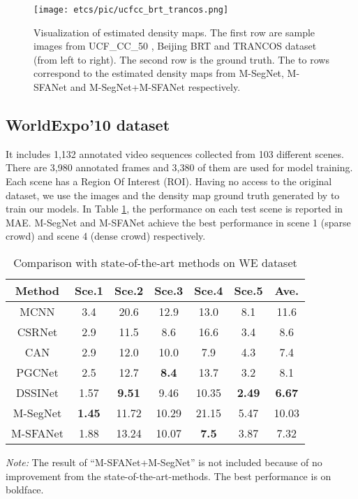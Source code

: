 \documentclass[10pt, conference, a4paper]{IEEEtran}
\begin{document}
\begin{figure}
    \centering
    \texttt{[image: etcs/pic/ucfcc\_brt\_trancos.png]}
    \caption{Visualization of estimated density maps. The first row are sample images from UCF\_CC\_50 \cite{bansal2015people}, Beijing BRT \cite{ding2018deeply} and TRANCOS \cite{guerrero2015extremely} dataset (from left to right). The second row is the ground truth. The  to  rows correspond to the estimated density maps from M-SegNet, M-SFANet and M-SegNet+M-SFANet respectively.}
    \label{fig:ucfcc_brt_trancos}
\end{figure}

\subsection{WorldExpo'10 dataset}
It includes 1,132 annotated video sequences collected from 103 different scenes. There are 3,980 annotated frames and 3,380 of them are used for model training. Each scene has a Region Of Interest (ROI). Having no access to the original dataset, we use the images and the density map ground truth generated by \cite{gao2019c} to train our models. In Table \ref{table:weres}, the performance on each test scene is reported in MAE. M-SegNet and M-SFANet achieve the best performance in scene 1 (sparse crowd) and scene 4 (dense crowd) respectively. 




\setlength{\tabcolsep}{4pt}
\begin{table}
\begin{center}
\caption{Comparison with state-of-the-art methods on WE \cite{zhang2015cross} dataset}
\begin{tabular}{c|c|c|c|c|c|c}
\hline
Method & Sce.1 & Sce.2 & Sce.3 & Sce.4 & Sce.5 & Ave.\\
\hline
MCNN \cite{zhang2016single} & 3.4 & 20.6 & 12.9 & 13.0 & 8.1 & 11.6\\
CSRNet \cite{li2018csrnet} & 2.9 & 11.5 & 8.6 & 16.6 & 3.4 & 8.6\\
CAN \cite{liu2019context} & 2.9 & 12.0 & 10.0 & 7.9 & 4.3 & 7.4\\
PGCNet \cite{yan2019perspective} & 2.5 & 12.7 & \textbf{8.4} & 13.7 & 3.2 & 8.1\\
DSSINet \cite{liu2019crowd} & 1.57 & \textbf{9.51} & 9.46 & 10.35 & \textbf{2.49} & \textbf{6.67}\\
\hline
M-SegNet & \textbf{1.45} & 11.72 & 10.29 & 21.15 & 5.47 & 10.03\\
M-SFANet & 1.88 & 13.24 & 10.07 & \textbf{7.5} & 3.87 & 7.32\\
\hline
\end{tabular}
\label{table:weres}
\end{center}
\footnotesize\emph{Note:} The result of ``M-SFANet+M-SegNet'' is not included because of no improvement from the state-of-the-art-methods. The best performance is on boldface.
\end{table}
\setlength{\tabcolsep}{1.4pt} 
\end{document}
